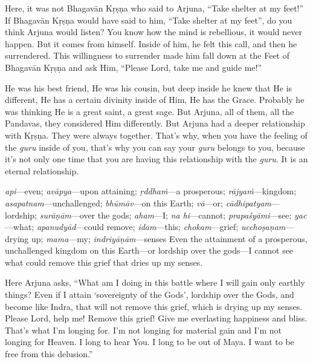 Here, it was not Bhagavān Kṛṣṇa who said to Arjuna, “Take shelter at my feet!” If Bhagavān Kṛṣṇa would have said to him, “Take shelter at my feet”, do you think Arjuna would listen? You know how the mind is rebellious, it would never happen. But it comes from himself. Inside of him, he felt this call, and then he surrendered. This willingness to surrender made him fall down at the Feet of Bhagavān Kṛṣṇa and ask Him, “Please Lord, take me and guide me!”

He was his best friend, He was his cousin, but deep inside he knew that He is different, He has a certain divinity inside of Him, He has the Grace. Probably he was thinking He is a great saint, a great sage. But Arjuna, all of them, all the Pandavas, they considered Him differently. But Arjuna had a deeper relationship with Kṛṣṇa. They were always together. That’s why, when you have the feeling of the \textit{guru} inside of you, that’s why you can say your \textit{guru} belongs to you, because it’s not only one time that you are having this relationship with the \textit{guru}. It is an eternal relationship.

{%
  \textit{api}---even; 
  \textit{avāpya}---upon attaining; 
  \textit{ṛddhaṁ}---a prosperous; 
  \textit{rājyaṁ}---kingdom; 
  \textit{asapatnam}---unchallenged; 
  \textit{bhūmāv}---on this Earth; 
  \textit{vā}---or; 
  \textit{cādhipatyam}---lordship; 
  \textit{surāṇām}---over the gods; 
  \textit{aham}---I; 
  \textit{na hi}---cannot; 
  \textit{prapaśyāmi}---see; 
  \textit{yac}---what; 
  \textit{apanudyād}---could remove; 
  \textit{idam}---this; 
  \textit{chokam}---grief; 
  \textit{ucchoṣaṇam}---drying up; 
  \textit{mama}---my; 
  \textit{indriyāṇām}---senses
}
{%
  Even the attainment of a prosperous, unchallenged kingdom on this Earth—or lordship over the gods—I cannot see what could remove this grief that dries up my senses.
}

Here Arjuna asks, “What am I doing in this battle where I will gain only earthly things? Even if I attain ‘sovereignty of the Gods’, lordship over the Gods, and become like Indra, that will not remove this grief, which is drying up my senses. Please Lord, help me! Remove this grief! Give me everlasting happiness and bliss. That’s what I’m longing for. I’m not longing for material gain and I’m not longing for Heaven. I long to hear You. I long to be out of Maya. I want to be free from this delusion.”

